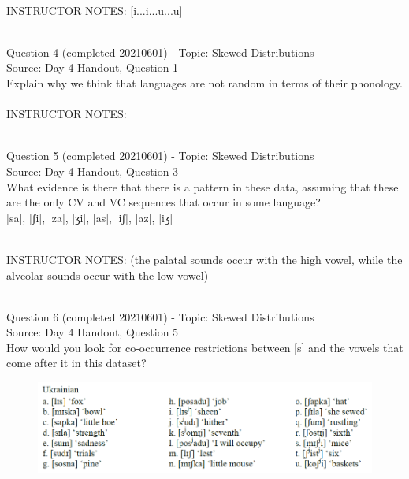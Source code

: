 \documentclass[12pt]{article}
\begin{document}
~\\
INSTRUCTOR NOTES: [i...i...u...u]


~\\

{\large Question 4} (completed 20210601) - Topic: Skewed Distributions\\
Source: Day 4 Handout, Question 1\\

Explain why we think that languages are not random in terms of their phonology.\\


~\\
INSTRUCTOR NOTES: 


~\\

{\large Question 5} (completed 20210601) - Topic: Skewed Distributions\\
Source: Day 4 Handout, Question 3\\

What evidence is there that there is a pattern in these data, assuming that these are the only CV and VC sequences that occur in some language?\\

{[sa]}, {[ʃi]}, {[za]}, {[ʒi]}, {[as]}, {[iʃ]}, {[az]}, {[iʒ]}


~\\
INSTRUCTOR NOTES: (the palatal sounds occur with the high vowel, while the alveolar sounds occur with the low vowel)


~\\

{\large Question 6} (completed 20210601) - Topic: Skewed Distributions\\
Source: Day 4 Handout, Question 5\\

How would you look for co-occurrence restrictions between [s] and the vowels that come after it in this dataset?\\

\begin{figure}[H]
\includegraphics{../images/ukrainian.png}
\end{figure}
\end{document}
